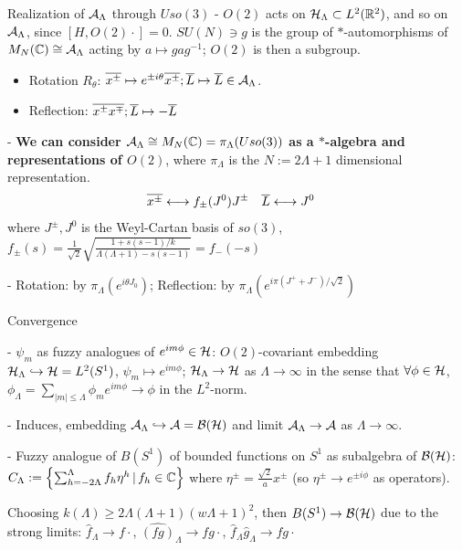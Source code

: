 \begin{frame}{Realization of $\mathcal A_\Lambda$ through $Uso(3)$} %
    - $O(2)$ acts on $\mathcal H_\Lambda \subset L^2(\mathbb R^2)$, and so on $\mathcal A_\Lambda$, since $[H, O(2)\cdot ] = 0$. $SU(N) \ni g$ is the group of $*$-automorphisms of $M_N(\mathbb C) \cong \mathcal A_\Lambda$ acting by $a \mapsto g a g^{-1}$; $O(2)$ is then a subgroup. %
        \begin{itemize}
            
        \item Rotation $R_\theta$: $\overline{x^\pm} \mapsto e^{\pm i \theta} \overline{x ^\pm}; \overline{L} \mapsto \overline{L} \in \mathcal A_\Lambda$.
        
        \item Reflection: $\overline{x^\pm} \overline{x^\mp}; \overline{L} \mapsto -\overline{L}$
        
        \end{itemize}
    
    - \textbf{We can consider $\mathcal A_\Lambda \cong  M_N(\mathbb C) = \pi_\Lambda(Uso(3))$ as a $*$-algebra and representations of $O(2)$}, where $\pi_\Lambda$ is the $N := 2 \Lambda + 1$ dimensional representation.
    \begin{align}
        \overline{x^\pm} &\longleftrightarrow f_\pm (J^0) J^\pm &
        \overline{L} &\longleftrightarrow J^0
    \end{align}
    where $J^\pm, J^0$ is the Weyl-Cartan basis of $so(3)$, $f_\pm(s) = \frac{1}{\sqrt{2}} \sqrt{\frac{1 + s(s-1)/k}{\Lambda (\Lambda + 1) - s(s-1)}} = f_-(-s)$%

    - Rotation: by $\pi_\Lambda(e^{i \theta J_0})$; Reflection: by $\pi_\Lambda(e^{i\pi (J^+ + J^-)/\sqrt{2}})$
\end{frame}

\begin{frame}{Convergence} %

    - $\psi_m$ as fuzzy analogues of $e^{i m \phi} \in \mathcal H$: $O(2)$-covariant embedding $\mathcal H_\Lambda \hookrightarrow \mathcal H = L^2(S^1)$, $\psi_m \mapsto e^{im\phi}$; \hfill \then $\mathcal H_\Lambda \to \mathcal H$ as $\Lambda \to \infty$ in the sense that $\forall \phi \in \mathcal H$, $\phi_\Lambda = \sum_{|m| \leq \Lambda} \phi_m e^{im\phi} \to \phi$ in the $L^2$-norm.
    
    - Induces, embedding $\mathcal A_\Lambda \hookrightarrow \mathcal A = \mathcal B(\mathcal H)$ and limit $\mathcal A_\Lambda \to \mathcal A$ as $\Lambda \to \infty$.
    
    - Fuzzy analogue of $B(S^1)$ of bounded functions on $S^1$ as subalgebra of $\mathcal B(\mathcal H)$: $C_\Lambda := \left\{ \sum_{h = -2\Lambda}^\Lambda f_h \eta^h \,|\, f_h \in \mathbb C\right\}$ where $\eta^\pm  = \frac{\sqrt{2}}{a}x^\pm$ (so $\eta^\pm \to e^{\pm i \phi}$ as operators).
    
    Choosing $k(\Lambda) \geq 2 \Lambda(\Lambda + 1)(w\Lambda+1)^2$, then $B(S^1) \to \mathcal B(\mathcal H)$ due to the strong limits: $\hat f_\Lambda \to f\cdot$, $\hat{(fg)}_\Lambda \to fg\cdot $, $\hat f_\Lambda \hat g_\Lambda \to fg\cdot$

\end{frame}

